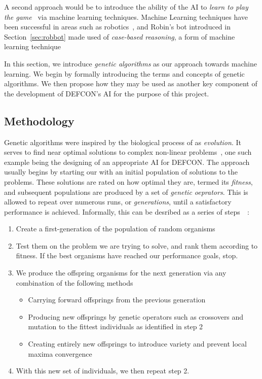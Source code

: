         A second approach would be to introduce the ability of the AI to \emph{learn to play the game}~\cite{ml-and-games} via machine learning techniques. Machine Learning techniques have been successful in areas such as robotics~\cite{robotics}, and Robin's bot introduced in Section~\ref{sec:robbot} made used of \emph{case-based reasoning}, a form of machine learning technique 
        
        In this section, we introduce \emph{genetic algorithms} as our approach towards machine learning. We begin by formally introducing the terms and concepts of genetic algorithms. We then propose how they may be used as another key component of the development of DEFCON's AI for the purpose of this project.
        
        \pagebreak
        
        \subsection{Methodology}

        Genetic algorithms were inspired by the biological process of as \emph{evolution}. It serves to find near optimal solutions to complex non-linear problems~\cite{troll}, one such example being the designing of an appropriate AI for DEFCON. The approach usually begins by starting our with an initial population of solutions to the problems. These solutions are rated on how optimal they are, termed its \emph{fitness}, and subsequent populations are produced by a set of \emph{genetic oeprators}. This is allowed to repeat over numerous runs, or \emph{generations}, until a satisfactory performance is achieved. Informally, this can be desribed as a series of steps~\cite{mitchell}~\cite{troll}:
        
        \begin{enumerate}
            \item Create a first-generation of the population of random organisms
            \item Test them on the problem we are trying to solve, and rank them according to fitness. If the best organisms have reached our performance goals, stop.
            \item We produce the offspring organisms for the next generation via any combination of the following methods
            \begin{itemize}
                \item Carrying forward offsprings from the previous generation
                \item Producing new offsprings by genetic operators such as crossovers and mutation to the fittest individuals as identified in step 2
                \item Creating entirely new offsprings to introduce variety and prevent local maxima convergence
            \end{itemize}
            \item With this new set of individuals, we then repeat step 2.
        \end{enumerate}
                    
